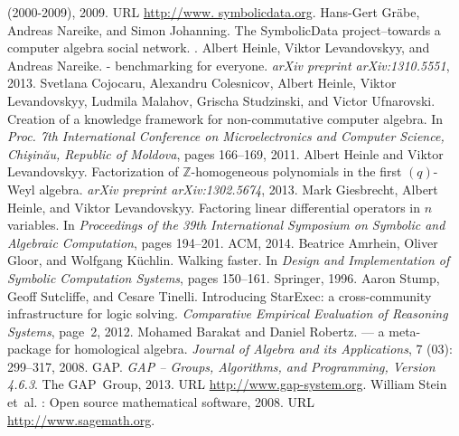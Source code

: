 \documentclass[12pt]{article}
\begin{document}
\begin{thebibliography}{21}
  (2000-2009), 2009.  \newblock URL \url{http://www. symbolicdata.org}.
 Hans-Gert Gr{\"a}be, Andreas Nareike,
  and Simon Johanning.  \newblock The {\sc SymbolicData} project--towards a
  computer algebra social network.  .
 Albert Heinle, Viktor Levandovskyy, and
  Andreas Nareike.   - benchmarking for
  everyone.  \newblock \emph{arXiv preprint arXiv:1310.5551}, 2013.
 Svetlana Cojocaru, Alexandru
  Colesnicov, Albert Heinle, Viktor Levandovskyy, Ludmila Malahov, Grischa
  Studzinski, and Victor Ufnarovski.  \newblock Creation of a knowledge
  framework for non-commutative computer algebra.  \newblock In \emph{Proc. 7th
    International Conference on Microelectronics and Computer Science,
    Chi\c{s}in\u{a}u, Republic of Moldova}, pages 166--169, 2011.
 Albert Heinle and Viktor Levandovskyy.
  \newblock Factorization of $\mathbb{Z}$-homogeneous polynomials in the first
  $(q)$-{W}eyl algebra.  \newblock \emph{arXiv preprint arXiv:1302.5674}, 2013.
 Mark Giesbrecht, Albert Heinle, and
  Viktor Levandovskyy.  \newblock Factoring linear differential operators in
  $n$ variables.  \newblock In \emph{Proceedings of the 39th International
    Symposium on Symbolic and Algebraic Computation}, pages 194--201. ACM,
  2014.
 Beatrice Amrhein, Oliver Gloor, and
  Wolfgang K{\"u}chlin.  \newblock Walking faster.  \newblock In \emph{Design
    and Implementation of Symbolic Computation Systems}, pages
  150--161. Springer, 1996.
 Aaron Stump, Geoff Sutcliffe, and Cesare
  Tinelli.  \newblock Introducing {S}tar{E}xec: a cross-community
  infrastructure for logic solving.  \newblock \emph{Comparative Empirical
    Evaluation of Reasoning Systems}, page~2, 2012.
 Mohamed Barakat and Daniel Robertz.
   --- a meta-package for homological algebra.  \newblock
  \emph{Journal of Algebra and its Applications}, 7 (03):
  299--317, 2008.
 GAP.  \newblock \emph{{GAP -- Groups, Algorithms, and
    Programming, Version 4.6.3}}.  \newblock The GAP~Group, 2013.  \newblock
  URL \url{http://www.gap-system.org}.
 William Stein et~al.  : Open source mathematical software, 2008.  \newblock URL
  \url{http://www.sagemath.org}.

\end{thebibliography}
\end{document}
